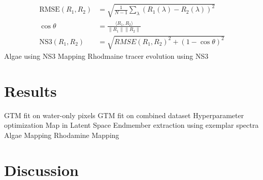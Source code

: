 \documentclass{article}
\begin{document}
\begin{outline}[enumerate]
                \begin{align}
                    \text{RMSE}(R_1, R_2) &= \sqrt{\frac{1}{N-1}\sum_\lambda \left(R_{1}(\lambda) - R_2(\lambda) \right)^2} \\
                    \cos\theta &= \frac{\langle R_1 , R_2 \rangle}{\lVert R_1\rVert \lVert R_2 \rVert} \\
                    \text{NS3}(R_1, R_2) &= \sqrt{RMSE(R_1, R_2)^2 + (1-\cos\theta)^2}
                \end{align}
            \4 Algae using NS3
            \4 Mapping Rhodmaine tracer evolution using NS3
\end{outline}

\section*{Results}
\begin{outline}[enumerate]
\1 GTM fit on water-only pixels
\1 GTM fit on combined dataset
    \2 Hyperparameter optimization
    \2 Map in Latent Space
    \2 Endmember extraction using exemplar spectra 
    \2 Algae Mapping
    \2 Rhodamine Mapping
\end{outline}

\section*{Discussion}
\end{document}
